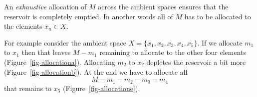 \documentclass[
  letterpaper,
  DIV=11,
  numbers=noendperiod]{scrartcl}
\begin{document}
An \emph{exhaustive} allocation of \(M\) across the ambient spaces
ensures that the reservoir is completely emptied. In another words all
of \(M\) has to be allocated to the elements \(x_{n} \in X\).

For example consider the ambient space
\(X = \{x_1, x_2, x_3, x_4, x_5 \}\). If we allocate \(m_{1}\) to
\(x_{1}\) then that leaves \(M - m_{1}\) remaining to allocate to the
other four elements (Figure~\ref{fig-allocationa}). Allocating \(m_{2}\)
to \(x_{2}\) depletes the reservoir a bit more
(Figure~\ref{fig-allocationb}). At the end we have to allocate all \[
M - m_{1} - m_{2} - m_{3} - m_{4}
\] that remains to \(x_{5}\) (Figure~\ref{fig-allocatione}).

\begin{figure}

\begin{minipage}[t]{0.50\linewidth}

{\centering 


}

\subcaption{\label{fig-allocationa}}
\end{minipage}%
%
\begin{minipage}[t]{0.50\linewidth}

{\centering 

\raisebox{-\height}{

}}
\end{minipage}
\end{figure}
\end{document}
